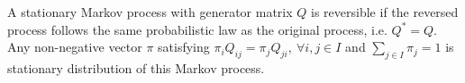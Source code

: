 \documentclass[a4paper,10pt,english]{article}
\begin{document}
\begin{lem} A stationary Markov process with generator matrix $Q$ is reversible if the reversed process follows the same probabilistic law as the original process, i.e. $Q^*= Q$. Any non-negative vector $\pi$ satisfying $\pi_iQ_{ij}=\pi_jQ_{ji},~\forall i,j \in I$ and $\sum_{j \in I}\pi_j=1$ is stationary distribution of this Markov process. 
\end{lem}
%
\end{document}
